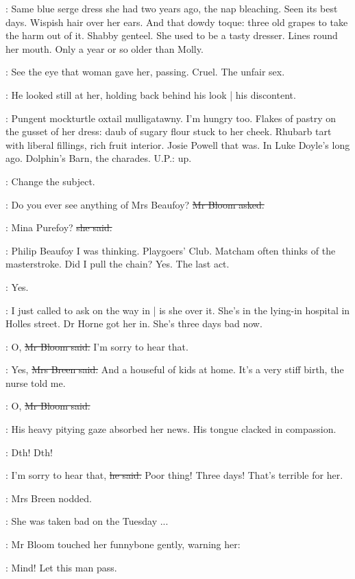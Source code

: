 \BloomInt:
Same blue serge dress she had two years ago,
the nap bleaching.
Seen its best days.
Wispish hair over her ears.
And that dowdy toque:
three old grapes to take the harm out of it.
Shabby genteel.
She used to be a tasty dresser.
Lines round her mouth.
Only a year or so older than Molly.

\BloomInt:
See the eye that woman gave her,
passing.
Cruel.
The unfair sex.

:
He looked still at her,
holding back behind his look |
his discontent.

\BloomInt:
Pungent mockturtle oxtail mulligatawny.
I'm hungry too.
Flakes of pastry on the gusset of her dress:
daub of sugary flour stuck to her cheek.
Rhubarb tart with liberal fillings,
rich fruit interior.
Josie Powell that was.
In Luke Doyle's long ago.
Dolphin's Barn,
the charades.
U.P.:
up.

\BloomInt:
Change the subject.

\Bloom:
Do you ever see anything of Mrs Beaufoy?
\sout{Mr Bloom asked.}

\josie:
Mina Purefoy?
\sout{she said.}

\BloomInt:
Philip Beaufoy I was thinking.
Playgoers' Club.
Matcham often thinks of the masterstroke.
Did I pull the chain?
Yes.
The last act.

\Bloom:
Yes.

\josie:
I just called to ask on the way in |
is she over it.
She's in the lying-in hospital in Holles street.
Dr Horne got her in.
She's three days bad now.

\Bloom:
O,
\sout{Mr Bloom said.}
I'm sorry to hear that.

\josie:
Yes,
\sout{Mrs Breen said.}
And a houseful of kids at home.
It's a very stiff birth,
the nurse told me.

\Bloom:
O,
\sout{Mr Bloom said.}

:
His heavy pitying gaze absorbed her news.
His tongue clacked in compassion.

\Bloom:
Dth!
Dth!

\Bloom:
I'm sorry to hear that,
\sout{he said.}
Poor thing!
Three days!
That's terrible for her.%

:
Mrs Breen nodded.

\josie:
She was taken bad on the Tuesday ...

:
Mr Bloom touched her funnybone gently,
warning her:

\Bloom:
Mind!
Let this man pass.

